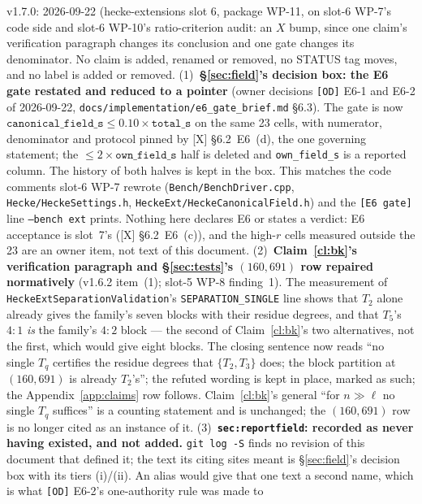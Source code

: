 \documentclass[11pt]{article}
\theoremstyle{remark}
\begin{document}
v1.7.0: 2026-09-22 (hecke-extensions slot 6, package WP-11, on slot-6 WP-7's
code side and slot-6 WP-10's ratio-criterion audit: an $X$ bump, since one claim's verification
paragraph changes its conclusion and one gate changes its denominator. No claim is added,
renamed or removed, no STATUS tag moves, and no label is added or removed.
(1)~\textbf{\S\ref{sec:field}'s decision box: the E6 gate restated and reduced to a
pointer} (owner decisions \texttt{[OD]} E6-1 and E6-2 of 2026-09-22,
\texttt{docs/implementation/e6\_gate\_brief.md} \S6.3). The gate is now
$\texttt{canonical\_field\_s}\le0.10\times\texttt{total\_s}$ on the same 23 cells, with
numerator, denominator and protocol pinned by [X] \S6.2~E6~(d), the one governing statement;
the $\le2\times\texttt{own\_field\_s}$ half is deleted and \texttt{own\_field\_s} is a reported
column. The history of both halves is kept in the box. This matches the code comments slot-6
WP-7 rewrote (\texttt{Bench/BenchDriver.cpp}, \texttt{Hecke/HeckeSettings.h},
\texttt{HeckeExt/HeckeCanonicalField.h}) and the \texttt{[E6 gate]} line \texttt{--bench ext}
prints. Nothing here declares E6 or states a verdict: E6 acceptance is slot~7's
([X] \S6.2~E6~(c)), and the high-$r$ cells measured outside the 23 are an owner item, not text
of this document.
(2)~\textbf{Claim~\ref{cl:bk}'s verification paragraph and \S\ref{sec:tests}'s $(160,691)$
row repaired normatively} (v1.6.2 item~(1); slot-5 WP-8 finding~1). The measurement of
\texttt{HeckeExtSeparationValidation}'s \texttt{SEPARATION\_SINGLE} line shows that $T_2$ alone
already gives the family's seven blocks with their residue degrees, and that $T_5$'s $4{:}1$
\emph{is} the family's $4{:}2$ block --- the second of Claim~\ref{cl:bk}'s two alternatives, not
the first, which would give eight blocks. The closing sentence now reads ``no single $T_q$
certifies the residue degrees that $\{T_2,T_3\}$ does; the block partition at $(160,691)$ is
already $T_2$'s''; the refuted wording is kept in place, marked as such; the
Appendix~\ref{app:claims} row follows. Claim~\ref{cl:bk}'s general ``for $n\gg\ell$ no single
$T_q$ suffices'' is a counting statement and is unchanged; the $(160,691)$ row is no longer
cited as an instance of it.
(3)~\textbf{\texttt{sec:reportfield}: recorded as never having existed, and not added.}
\texttt{git log -S} finds no revision of this document that defined it; the text its citing
sites meant is \S\ref{sec:field}'s decision box with its tiers (i)/(ii). An alias would give
that one text a second name, which is what \texttt{[OD]} E6-2's one-authority rule was made to
\end{document}
